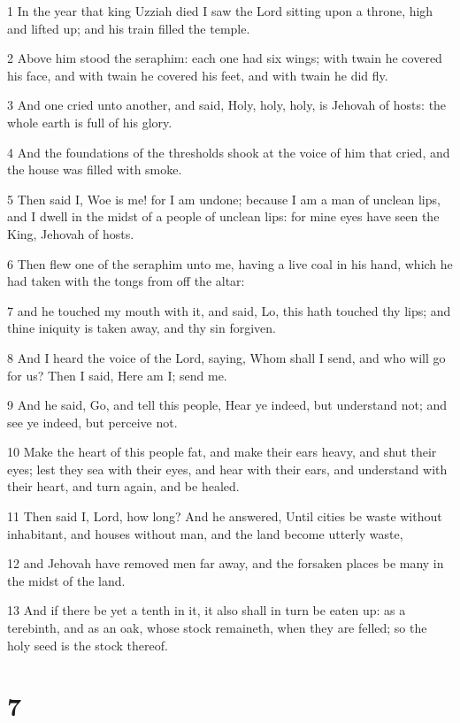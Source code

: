 \par 1 In the year that king Uzziah died I saw the Lord sitting upon a throne, high and lifted up; and his train filled the temple.
\par 2 Above him stood the seraphim: each one had six wings; with twain he covered his face, and with twain he covered his feet, and with twain he did fly.
\par 3 And one cried unto another, and said, Holy, holy, holy, is Jehovah of hosts: the whole earth is full of his glory.
\par 4 And the foundations of the thresholds shook at the voice of him that cried, and the house was filled with smoke.
\par 5 Then said I, Woe is me! for I am undone; because I am a man of unclean lips, and I dwell in the midst of a people of unclean lips: for mine eyes have seen the King, Jehovah of hosts.
\par 6 Then flew one of the seraphim unto me, having a live coal in his hand, which he had taken with the tongs from off the altar:
\par 7 and he touched my mouth with it, and said, Lo, this hath touched thy lips; and thine iniquity is taken away, and thy sin forgiven.
\par 8 And I heard the voice of the Lord, saying, Whom shall I send, and who will go for us? Then I said, Here am I; send me.
\par 9 And he said, Go, and tell this people, Hear ye indeed, but understand not; and see ye indeed, but perceive not.
\par 10 Make the heart of this people fat, and make their ears heavy, and shut their eyes; lest they sea with their eyes, and hear with their ears, and understand with their heart, and turn again, and be healed.
\par 11 Then said I, Lord, how long? And he answered, Until cities be waste without inhabitant, and houses without man, and the land become utterly waste,
\par 12 and Jehovah have removed men far away, and the forsaken places be many in the midst of the land.
\par 13 And if there be yet a tenth in it, it also shall in turn be eaten up: as a terebinth, and as an oak, whose stock remaineth, when they are felled; so the holy seed is the stock thereof.

\chapter{7}

